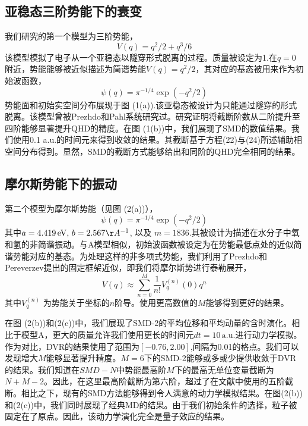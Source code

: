 \subsection{亚稳态三阶势能下的衰变}
我们研究的第一个模型为三阶势能，
\begin{equation}
	V(q)=q^{2} / 2+q^{3} / 6
\end{equation}
该模型模拟了电子从一个亚稳态以隧穿形式脱离的过程。质量被设定为1.在$q=0$附近，势能能够被近似描述为简谐势能$V(q)=q^2/2$，其对应的基态被用来作为初始波函数，
\begin{equation}
	\psi(q)=\pi^{-1 / 4} \exp \left(-q^{2} / 2\right)
\end{equation}
势能面和初始实空间分布展现于图 (1(a)).该亚稳态被设计为只能通过隧穿的形式脱离。该模型曾被Prezhdo和Pahl系统研究过。研究证明将截断阶数从二阶提升至四阶能够显著提升QHD的精度。在图 (1(b))中，我们展现了SMD的数值结果。我们使用0.1 a.u.的时间元来得到收敛的结果。其截断基于方程(22)与(24)所述辅助相空间分布得到。显然，SMD的截断方式能够给出和同阶的QHD完全相同的结果。


\subsection{摩尔斯势能下的振动}
第二个模型为摩尔斯势能（见图 (2(a))），
\begin{equation}
	\psi(q)=\pi^{-1 / 4} \exp \left(-q^{2} / 2\right)
\end{equation}
其中$a=4.419 \, \mathrm{eV},\, b = 2.567 \AA ^{-1}$, 以及 $m=1836$.其被设计为描述在水分子中氧和氢的非简谐振动。与A模型相似，初始波函数被设定为在势能最低点处的近似简谐势能对应的基态。为处理这样的非多项式势能，我们利用了Prezhdo和Pereverzev提出的固定框架近似，即我们将摩尔斯势进行泰勒展开，
\begin{equation}
	V(q) \approx \sum_{n=0}^{M} \frac{1}{n !} V_{q}^{(n)}(0) q^{n}
\end{equation}
其中$V_{q}^{(n)}$ 为势能关于坐标的$n$阶导。使用更高数值的$M$能够得到更好的结果。

在图 (2(b))和(2(c))中，我们展现了SMD-2的平均位移和平均动量的含时演化。相比于模型A，更大的质量允许我们使用更长的时间元$dt=10\,\mathrm{a.u.}$进行动力学模拟。作为对比，DVR的结果使用了范围为$[-0.76,2.00]$,间隔为0.01的格点。我们可以发现增大$M$能够显著提升精度。$M=6$下的SMD-2能够或多或少提供收敛于DVR的结果。我们知道在$SMD-N$中势能最高阶$M$下的最高无单位变量截断为$N+M-2$。因此，在这里最高阶截断为第六阶，超过了在文献中使用的五阶截断。相比之下，现有的SMD方法能够得到令人满意的动力学模拟结果。在图(2(b))和(2(c))中，我们同时展现了经典MD的结果。由于我们初始条件的选择，粒子被固定在了原点。因此，该动力学演化完全是量子效应的结果。

